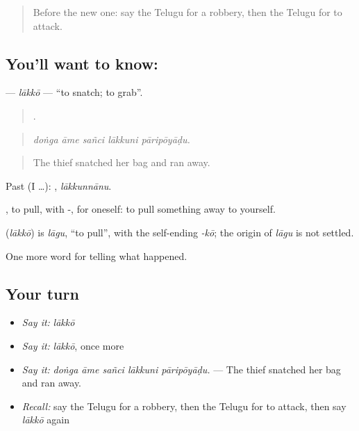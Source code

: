 \label{lesson:TE-C348-lakko}



\begin{quote}
Before the new one: say the Telugu for a robbery, then the Telugu for to attack.
\end{quote}

\subsection*{You'll want to know: }
\textbf{} — \emph{lākkō} — \textquotedblleft{}to snatch; to grab\textquotedblright{}.

\begin{quote}
    .
\end{quote}

\begin{quote}
\emph{doṅga āme sañci lākkuni pāripōyāḍu.}
\end{quote}

\begin{quote}
The thief snatched her bag and ran away.
\end{quote}

Past (I …): , \emph{lākkunnānu}.

, to pull, with -, for oneself: to pull something away to yourself.

\begin{cousinweb}
\textbf{} (\emph{lākkō}) is \emph{lāgu}, \textquotedblleft{}to pull\textquotedblright{}, with the self-ending \emph{-kō}; the origin of \emph{lāgu} is not settled.
\end{cousinweb}

\begin{grammarlens}[title={What you've built}]
One more word for telling what happened.
\end{grammarlens}

\subsection*{Your turn}
\begin{itemize}
\raggedright
  \item \emph{Say it:} \emph{lākkō}
  \item \emph{Say it:} \emph{lākkō}, once more
  \item \emph{Say it:} \emph{doṅga āme sañci lākkuni pāripōyāḍu.} — The thief snatched her bag and ran away.
  \item \emph{Recall:} say the Telugu for a robbery, then the Telugu for to attack, then say \emph{lākkō} again
\end{itemize}

